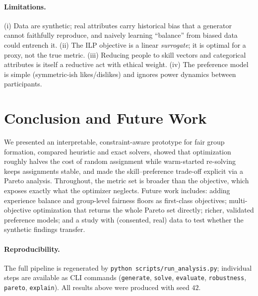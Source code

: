 \documentclass[11pt]{article}
\begin{document}
\paragraph{Limitations.} (i) Data are synthetic; real attributes carry historical bias that
a generator cannot faithfully reproduce, and naively learning ``balance'' from biased data
could entrench it. (ii) The ILP objective is a linear \emph{surrogate}; it is optimal for a
proxy, not the true metric. (iii) Reducing people to skill vectors and categorical
attributes is itself a reductive act with ethical weight. (iv) The preference model is
simple (symmetric-ish likes/dislikes) and ignores power dynamics between participants.

\section{Conclusion and Future Work}
We presented an interpretable, constraint-aware prototype for fair group formation, compared
heuristic and exact solvers, showed that optimization roughly halves the cost of random
assignment while warm-started re-solving keeps assignments stable, and made the
skill--preference trade-off explicit via a Pareto analysis. Throughout, the metric set is
broader than the objective, which exposes exactly what the optimizer neglects. Future work
includes: adding experience balance and group-level fairness floors as first-class
objectives; multi-objective optimization that returns the whole Pareto set directly;
richer, validated preference models; and a study with (consented, real) data to test whether
the synthetic findings transfer.

\paragraph{Reproducibility.} The full pipeline is regenerated by
\texttt{python scripts/run\_analysis.py}; individual steps are available as CLI commands
(\texttt{generate}, \texttt{solve}, \texttt{evaluate}, \texttt{robustness},
\texttt{pareto}, \texttt{explain}). All results above were produced with seed $42$.
\end{document}
